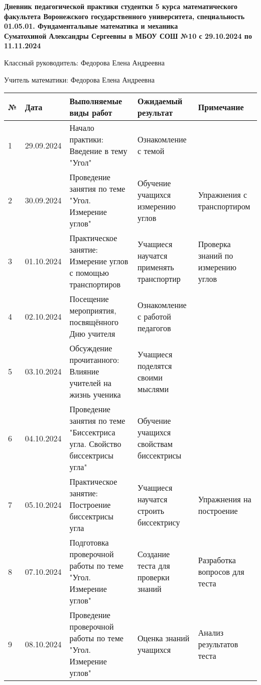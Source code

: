 \documentclass{article}
\begin{document}
\begin{center}
    \textbf{Дневник педагогической практики студентки 5 курса математического факультета Воронежского государственного университета, специальность 01.05.01. Фундаментальные математика и механика }\\
    \textbf{Суматохиной Александры Сергеевны в МБОУ СОШ №10 с 29.10.2024 по 11.11.2024}\\
    \end{center}

Классный руководитель: Федорова Елена Андреевна

Учитель математики: Федорова Елена Андреевна\\


\begin{tabular}{|p{1cm}|p{1.5cm}|p{5.5cm}|p{4.5cm}|p{3.5cm}|}
\hline
\textbf{№} & \textbf{Дата} & \textbf{Выполняемые виды работ} & \textbf{Ожидаемый результат} & \textbf{Примечание} \\ \hline
1 & 29.09.2024 & Начало практики: Введение в тему "Угол" & Ознакомление с темой & \\ \hline
2 & 30.09.2024 & Проведение занятия по теме "Угол. Измерение углов" & Обучение учащихся измерению углов & Упражнения с транспортиром \\ \hline
3 & 01.10.2024 & Практическое занятие: Измерение углов с помощью транспортиров & Учащиеся научатся применять транспортир & Проверка знаний по измерению углов \\ \hline
4 & 02.10.2024 & Посещение мероприятия, посвящённого Дню учителя & Ознакомление с работой педагогов & \\ \hline
5 & 03.10.2024 & Обсуждение прочитанного: Влияние учителей на жизнь ученика & Учащиеся поделятся своими мыслями & \\ \hline
6 & 04.10.2024 & Проведение занятия по теме "Биссектриса угла. Свойство биссектрисы угла" & Обучение учащихся свойствам биссектрисы &  \\ \hline
7 & 05.10.2024 & Практическое занятие: Построение биссектрисы угла & Учащиеся научатся строить биссектрису & Упражнения на построение \\ \hline
8 & 07.10.2024 & Подготовка проверочной работы по теме "Угол. Измерение углов" & Создание теста для проверки знаний & Разработка вопросов для теста \\ \hline
9 & 08.10.2024 & Проведение проверочной работы по теме "Угол. Измерение углов" & Оценка знаний учащихся & Анализ результатов теста \\ \hline

\end{tabular}
\end{document}
